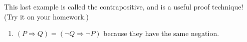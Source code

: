 \documentclass[12pt, reqno]{amsart}
\begin{document}
\vspace{10pt}

This last example is called the contrapositive, and is a useful proof technique! (Try it on your homework.)

\begin{enumerate}
\item $(P \Rightarrow Q) = (\neg Q \Rightarrow \neg P)$ because they have the same negation.
\end{enumerate}
\end{document}
